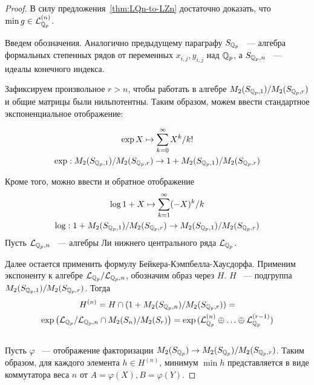 \begin{proof}
    В силу предложения~\ref{thm:LQn-to-LZn} достаточно доказать, что $\min g \in \mathcal{L}^{(n)}_{\mathbb{Q}_p}$.

    Введем обозначения.
    Аналогично предыдущему параграфу $S_{\mathbb{Q}_p}$ ~--- алгебра формальных степенных рядов от переменных $x_{i,j}, y_{i,j}$ над $\mathbb{Q}_p$, а $S_{\mathbb{Q}_p, n}$ ~--- идеалы конечного индекса.

    Зафиксируем произвольное $r>n$, чтобы работать в алгебре $M_2(S_{\mathbb{Q}_p, 1}) / M_2(S_{\mathbb{Q}_p, r})$ и общие матрицы были нильпотентны.
    Таким образом, можем ввести стандартное экспоненциальное отображение:

    \begin{gather*}
        \exp X \mapsto \sum\limits_{k=0}^{\infty} X^k / k!\\
        \exp: M_2(S_{\mathbb{Q}_p, 1}) / M_2(S_{\mathbb{Q}_p, r})\to 1 + M_2(S_{\mathbb{Q}_p, 1}) / M_2(S_{\mathbb{Q}_p, r})
    \end{gather*}

    Кроме того, можно ввести и обратное отображение
    \begin{gather*}
        \log 1 + X \mapsto \sum\limits_{k=1}^{\infty} (-X)^k / k\\
        \log: 1 + M_2(S_{\mathbb{Q}_p, 1}) / M_2(S_{\mathbb{Q}_p, r})\to M_2(S_{\mathbb{Q}_p, 1}) / M_2(S_{\mathbb{Q}_p, r})
    \end{gather*}
    Пусть $\mathcal{L}_{\mathbb{Q}_p, n}$ ~--- алгебры Ли нижнего центрального ряда $\mathcal{L}_{\mathbb{Q}_p}$.

    Далее остается применить формулу Бейкера-Кэмпбелла-Хаусдорфа.
    Применим экспоненту к алгебре $\mathcal{L}_{\mathbb{Q}_p} / \mathcal{L}_{\mathbb{Q}_p, n}$, обозначим образ через $H$.
    $H$ ~--- подгруппа $M_2(S_{\mathbb{Q}_p, 1}) / M_2(S_{\mathbb{Q}_p, r})$.
    Тогда\\
    \begin{multline*}
        H^{(n)} = H\cap (1 + M_2(S_{\mathbb{Q}_p, n}) / M_2(S_{\mathbb{Q}_p, r})) = \\
        \exp{\left( \ensuremath{\mathcal{L}_{\mathbb{Q}_p}}/\ensuremath{\mathcal{L}_{\mathbb{Q}_p, n}}\cap M_2(S_n)/M_2(S_r) \right)}= \exp{(\ensuremath{\mathcal{L}^{(n)}_{\mathbb{Q}_p}}\oplus \ldots \oplus \ensuremath{\mathcal{L}_{\mathbb{Q}_p}}^{(r-1)})}
    \end{multline*}\\
    Пусть $\varphi$ ~--- отображение факторизации $M_2(S_{\mathbb{Q}_p})\to M_2(S_{\mathbb{Q}_p})/M_2(S_{\mathbb{Q}_p, r})$.
    Таким образом, для каждого элемента $h \in H^{(n)}$, минимум $\min h$ представляется в виде коммутатора веса $n$ от $A=\varphi(X), B=\varphi(Y)$.


\end{proof}
